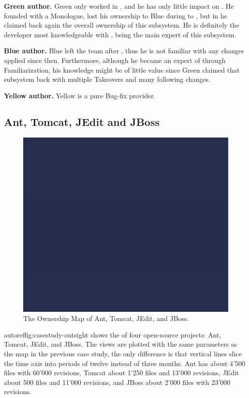 \textbf{Green author.} Green only worked in , and he has only little impact on . He founded  with a Monologue, lost his ownership to Blue during  to , but in  he claimed back again the overall ownership of this subsystem. He is definitely the developer most knowledgeable with , being the main expert of this subsystem.

\textbf{Blue author.} Blue left the team after , thus he is not familiar with any changes applied since then. Furthermore, although he became an expert of  through Familiarization, his knowledge might be of little value since Green claimed that subsystem back with multiple Takeovers and many following changes.

\textbf{Yellow author.} Yellow is a pure Bug-fix provider.

\subsection{Ant, Tomcat, JEdit and JBoss}

\begin{figure}[htb]
\begin{center}
\includegraphics[width=12.5cm]{casestudies-overview}
\caption{The Ownership Map of Ant, Tomcat, JEdit, and JBoss.}
\label{fig:casestudies-owerview}
\end{center}
\end{figure}

autoref{fig:casestudy-outsight} shows the \omap of four open-source projects: Ant, Tomcat, JEdit, and JBoss. The views are plotted with the same parameters as the map in the previous case study, the only difference is that vertical lines slice the time axis into periods of twelve instead of three months. Ant has about 4'500 files with 60'000 revisions, Tomcat about 1'250 files and 13'000 revisions, JEdit about 500 files and 11'000 revisions, and JBoss about 2'000 files with 23'000 revisions.


